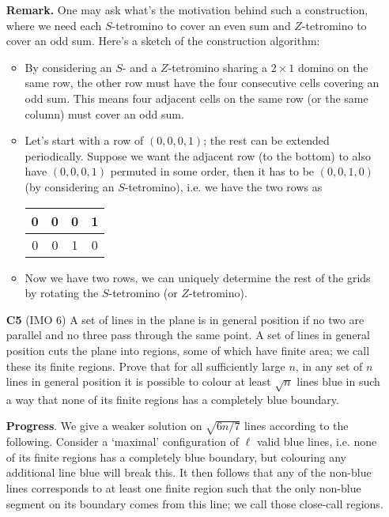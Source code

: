 \documentclass[11pt,a4paper]{article}
\begin{document}
\begin{enumerate}
    \textbf{Remark.} One may ask what's the motivation behind such a construction, 
    where we need each $S$-tetromino to cover an even sum and $Z$-tetromino to cover an odd sum. 
    Here's a sketch of the construction algorithm: 
    \begin{itemize}
    	\item By considering an $S$- and a $Z$-tetromino sharing a $2\times 1$ domino on the same row, 
    	the other row must have the four consecutive cells covering an odd sum. 
    	This means four adjacent cells on the same row (or the same column) must cover an odd sum. 
    	
    	\item Let's start with a row of $(0, 0, 0, 1)$; the rest can be extended periodically. 
    	Suppose we want the adjacent row (to the bottom) to also have $(0, 0, 0, 1)$ permuted in some order, 
    	then it has to be $(0, 0, 1, 0)$ (by considering an $S$-tetromino), i.e. we have the two rows as 
    	\begin{center}
    		\begin{tabular}{|c|c|c|c|}
    			\hline
    			0 & 0 & 0 & 1\\
    			\hline 
    			0 & 0 & 1 & 0\\
    			\hline
    		\end{tabular}
    	\end{center}
        
        \item Now we have two rows, we can uniquely determine the rest of the grids by rotating the $S$-tetromino (or $Z$-tetromino). 
    \end{itemize}
	
	\item[\textbf{C5}] (IMO 6)
	A set of lines in the plane is in general position if no two are parallel and no three pass through the same point. A set of lines in general position cuts the plane into regions, some of which have finite area; we call these its finite regions. Prove that for all sufficiently large $n$, in any set of $n$ lines in general position it is possible to colour at least $\sqrt{n}$ lines blue in such a way that none of its finite regions has a completely blue boundary.
	
	\textbf{Progress}. 
	We give a weaker solution on $\sqrt{6n/7}$ lines according to the following. 
	Consider a `maximal' configuration of $\ell$ valid blue lines, 
	i.e. none of its finite regions has a completely blue boundary, 
	but colouring any additional line blue will break this. 
	It then follows that any of the non-blue lines corresponds to at least one finite region such that the only non-blue segment on its boundary comes from this line; 
	we call those close-call regions. 
	

\end{enumerate}
\end{document}
